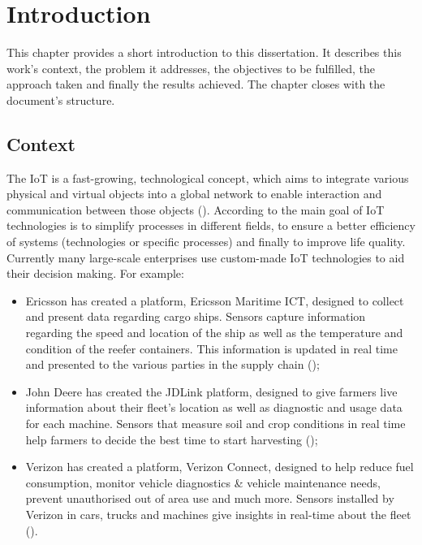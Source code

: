 \chapter{Introduction}
\label{chap:introduction}

This chapter provides a short introduction to this dissertation. It describes this work's context, the problem it addresses, the objectives to be fulfilled, the approach taken and finally the results achieved. The chapter closes with the document's structure. 

\section{Context}
\label{sec:introduction:context}

The \gls{IoT} is a fast-growing, technological concept, which aims to integrate various physical and virtual objects into a global network to enable interaction and communication between those objects (\cite{Atzori2010TheIO}). According to \cite{NIZETIC2020122877} the main goal of \gls{IoT} technologies is to simplify processes in different fields, to ensure a better efficiency of systems (technologies or specific processes) and finally to improve life quality. 
Currently many large-scale enterprises use custom-made \gls{IoT} technologies to aid their decision making. For example:
\begin{itemize}
    \item Ericsson has created a platform, Ericsson Maritime ICT, designed to collect and present data regarding cargo ships. Sensors capture information regarding the speed and location of the ship as well as the temperature and condition of the reefer containers. This information is updated in real time and presented to the various parties in the supply chain (\cite{ericson-marinetime});
    \item John Deere has created the JDLink platform, designed to give farmers live information about their fleet's location as well as diagnostic and usage data for each machine. Sensors that measure soil and crop conditions in real time help farmers to decide the best time to start harvesting (\cite{jdlink});
    \item Verizon has created a platform, Verizon Connect, designed to help reduce fuel consumption, monitor vehicle diagnostics \& vehicle maintenance needs, prevent unauthorised out of area use and much more. Sensors installed by Verizon in cars, trucks and machines give insights in real-time about the fleet (\cite{verizon-iot}).   
\end{itemize}


